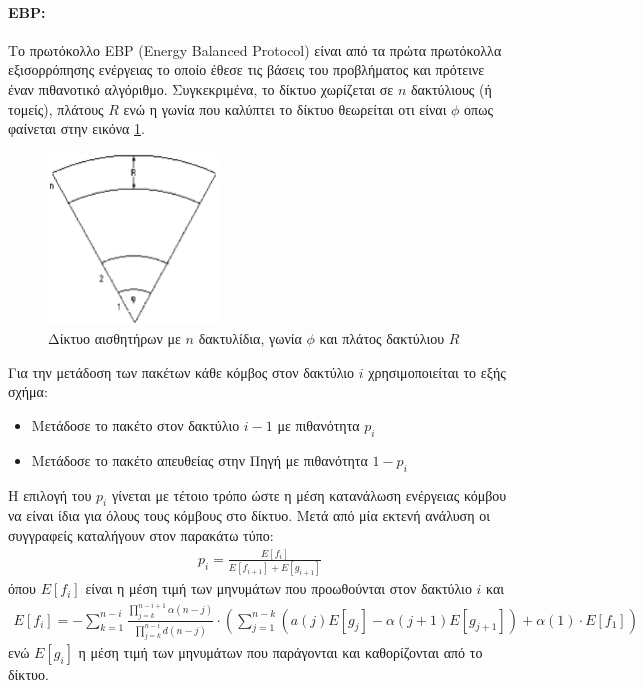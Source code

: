 \paragraph{EBP:} Το πρωτόκολλο EBP (Energy Balanced Protocol) \cite{ebp_protocol} είναι από τα πρώτα πρωτόκολλα εξισορρόπησης ενέργειας το οποίο έθεσε τις βάσεις του
προβλήματος και πρότεινε έναν πιθανοτικό αλγόριθμο. Συγκεκριμένα, το δίκτυο χωρίζεται σε $n$ δακτύλιους (ή τομείς), πλάτους $R$ ενώ η γωνία που καλύπτει το δίκτυο
θεωρείται οτι είναι $\phi$ οπως φαίνεται στην εικόνα \ref{fig:ebp_ring}.

\begin{figure}[h]
	\centering
	\includegraphics[width=0.4\textwidth]{images/ebp_ring.eps}
	\caption{Δίκτυο αισθητήρων με $n$ δακτυλίδια, γωνία $\phi$ και πλάτος δακτύλιου $R$}
	\label{fig:ebp_ring}
\end{figure}

Για την μετάδοση των πακέτων κάθε κόμβος στον δακτύλιο $i$ χρησιμοποιείται το εξής σχήμα:
\begin{itemize}
\item Μετάδοσε το πακέτο στον δακτύλιο $i-1$ με πιθανότητα $p_{i}$
\item Μετάδοσε το πακέτο απευθείας στην Πηγή με πιθανότητα $1-p_{i}$
\end{itemize}

Η επιλογή του $p_{i}$ γίνεται με τέτοιο τρόπο ώστε η μέση κατανάλωση ενέργειας κόμβου να είναι ίδια για όλους τους κόμβους στο δίκτυο.
Μετά από μία εκτενή ανάλυση οι συγγραφείς καταλήγουν στον παρακάτω τύπο:
\begin{align*}
p_{i} = \frac{E[f_{i}]}{E[f_{i+1}] + E[g_{i+1}]}
\end{align*}
όπου $E[f_{i}]$ είναι η μέση τιμή των μηνυμάτων που προωθούνται στον δακτύλιο $i$ και
\begin{align*}
E[f_{i}] = - \sum\limits^{n-i}_{k=1}\frac{\prod_{j=k}^{n-i+1}\alpha(n-j)}{\prod_{j=k}^{n-i}d(n-j)}\cdot
\left(\sum\limits_{j=1}^{n-k}(a(j)E[g_{j}]-\alpha(j+1)E[g_{j+1}])+\alpha(1)\cdot E[f_{1}]\right)
\end{align*}
ενώ $E[g_{i}]$ η μέση τιμή των μηνυμάτων που παράγονται και καθορίζονται από το δίκτυο.

